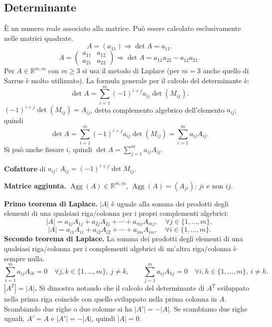 \documentclass[11pt,a4paper]{article}
\newcommand{\pagina}[1]{\clearpage}
\begin{document}
\subsection*{Determinante}
È un numero reale associato alla matrice. Può essere calcolato esclusivamente nelle matrici quadrate.
\[A=(a_{11})\Longrightarrow\det A=a_{11}.\]
\[A=\begin{pmatrix}a_{11}&a_{12}\\a_{21}&a_{22}\end{pmatrix}\Longrightarrow\det A=a_{11}a_{22}-a_{12}a_{21}.\]
Per $A\in\mathbb R^{m,m}$ con $m\ge3$ si usa il metodo di Laplace (per $m=3$ anche quello di Sarrus è molto utilizzato).
La formula generale per il calcolo del determinante è:
\[\det A=\sum_{i=1}^m(-1)^{i+j}a_{ij}\det(M_{ij}).\]
\pagina{12}
$(-1)^{i+j}\det(M_{ij})=A_{ij}$, detto complemento algebrico dell'elemento $a_{ij}$; quindi
\[\det A=\sum_{i=1}^m(-1)^{i+j}a_{ij}\det(M_{ij})=\sum_{i=1}^m a_{ij}A_{ij}.\]
Si può anche fissare $i$, quindi $\det A=\sum_{j=1}^m a_{ij}A_{ij}$.

\textbf{Cofattore} di $a_{ij}$: $A_{ij}=(-1)^{i+j}\det M_{ij}$.

\textbf{Matrice aggiunta.} $\operatorname{Agg}(A)\in\mathbb R^{m,m}$,
$\operatorname{Agg}(A)=(A_{ji})$: $ji$ e non $ij$.

\textbf{Primo teorema di Laplace.} $|A|$ è uguale alla somma dei prodotti degli elementi di una qualsiasi riga/colonna per i propri complementi algebrici:
\[|A|=a_{1j}A_{1j}+a_{2j}A_{2j}+\cdots+a_{mj}A_{mj},\quad\forall j\in\{1,\ldots,m\},\]
\[|A|=a_{i1}A_{i1}+a_{i2}A_{i2}+\cdots+a_{im}A_{im},\quad\forall i\in\{1,\ldots,m\}.\]
\textbf{Secondo teorema di Laplace.} La somma dei prodotti degli elementi di una qualsiasi riga/colonna per i complementi algebrici di un'altra riga/colonna è sempre nulla.
\pagina{13}
\[\sum_{i=1}^m a_{ij}A_{ik}=0\quad\forall j,k\in\{1,\ldots,m\},\ j\ne k,\qquad
\sum_{j=1}^m a_{ij}A_{hj}=0\quad\forall i,h\in\{1,\ldots,m\},\ i\ne h.\]
\textbf{$|A^T|=|A|$.} Si dimostra notando che il calcolo del determinante di $A^T$ sviluppato nella prima riga coincide con quello sviluppato nella prima colonna in $A$.
Scambiando due righe o due colonne si ha $|A'|=-|A|$. Se scambiamo due righe uguali, $A'=A$ e $|A'|=-|A|$, quindi $|A|=0$.
\end{document}
